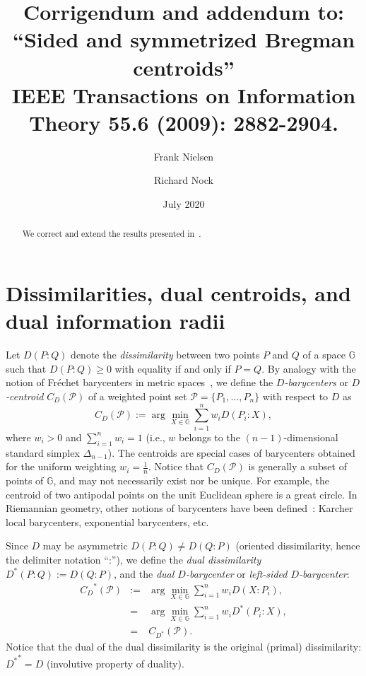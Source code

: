 \documentclass[11pt]{article}
\title{Corrigendum and addendum to:\\
``Sided and symmetrized Bregman centroids''\\ IEEE Transactions on Information Theory 55.6 (2009): 2882-2904.}
\author{Frank Nielsen \and Richard Nock}
\date{July 2020}
\def\bbG{\mathbb{G}}
\def\calP{\mathcal{P}}
\begin{document}
\maketitle

\begin{abstract}
We correct and extend the results presented in~\protect\cite{SBD-2009}.
\end{abstract}

\section{Dissimilarities, dual centroids, and dual information radii}

Let $D(P:Q)$ denote the {\em dissimilarity} between two points $P$ and $Q$ of a space $\bbG$ such that $D(P:Q)\geq 0$ with equality if and only if $P=Q$.
By analogy with the notion of Fr\'echet barycenters in metric spaces~\cite{Frechet-1948}, we define the {\em $D$-barycenters}
 or {\em $D$-centroid} $C_D(\calP)$ of a weighted point set
 $\calP=\{P_1,\ldots, P_n\}$ with respect to $D$ as
\begin{equation}
C_D(\calP) := \arg \min_{X\in\bbG}  \sum_{i=1}^n w_i D(P_i:X),
\end{equation}
where $w_i>0$ and $\sum_{i=1}^n w_i=1$ (i.e., $w$ belongs to the $(n-1)$-dimensional standard simplex $\Delta_{n-1}$).
The centroids are special cases of barycenters obtained for the uniform weighting $w_i=\frac{1}{n}$.
Notice that $C_D(\calP)$ is generally a subset of points of $\bbG$, and may not necessarily exist nor be unique.
For example, the centroid of two antipodal points on the unit Euclidean sphere is a great circle.
In Riemannian geometry, other notions of barycenters have been defined~\cite{Ahidar-2019}: Karcher local barycenters, exponential barycenters, etc.

Since $D$ may be asymmetric $D(P:Q)\not =D(Q:P)$ (oriented dissimilarity, hence the delimiter notation ``:''), 
we define the {\em dual dissimilarity} $D^*(P:Q):=D(Q:P)$, and the {\em dual $D$-barycenter} or {\em left-sided $D$-barycenter}:
\begin{eqnarray}
{C_D}^*(\calP) &:=& \arg \min_{X\in\bbG}  \sum_{i=1}^n w_i D(X:P_i),\\
&=& \arg \min_{X\in\bbG}  \sum_{i=1}^n w_i D^*(P_i:X),\\
&=& C_{D^*}(\calP).
\end{eqnarray}
Notice that the dual of the dual dissimilarity is the original (primal) dissimilarity: ${D^*}^*=D$ (involutive property of duality).
\end{document}
